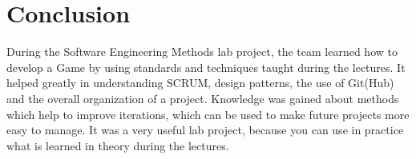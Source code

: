 \documentclass[10pt]{article}
\begin{document}
\newpage
\section*{Conclusion}
During the Software Engineering Methods lab project, the team learned how to develop a Game by using standards and techniques taught during the lectures. It helped greatly in understanding SCRUM, design patterns, the use of Git(Hub) and the overall organization of a project. Knowledge was gained about methods which help to improve iterations, which can be used to make future projects more easy to manage. It was a very useful lab project, because you can use in practice what is learned in theory during the lectures.
\end{document}
